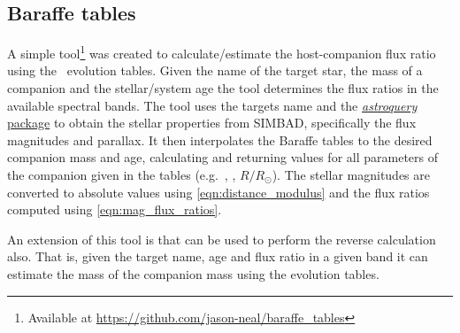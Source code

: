 \subsection{Baraffe tables}
\label{subsubsec:baraffe_tables_code}
A simple tool\footnote{Available at \href{https://github.com/jason-neal/baraffe_tables}{https://github.com/jason-neal/baraffe\_tables}} was created to calculate/estimate the host-companion flux ratio using the~\citet{baraffe_evolutionary_2003, baraffe_new_2015} evolution tables.
Given the name of the target star, the mass of a companion and the stellar/system age the tool determines the flux ratios in the available spectral bands.
The tool uses the targets name and the \href{https://zenodo.org/record/1160627}{\emph{astroquery} package} to obtain the stellar properties from {SIMBAD}, specifically the flux magnitudes and parallax.
It then interpolates the Baraffe tables to the desired companion mass and age, calculating and returning values for all parameters of the companion given in the tables (e.g.\ \Teff{}, \logg{}, \(R/R_{\odot}\)).
The stellar magnitudes are converted to absolute values using \cref{eqn:distance_modulus} and the flux ratios computed using \cref{eqn:mag_flux_ratios}.

An extension of this tool is that can be used to perform the reverse calculation also.
That is, given the target name, age and flux ratio in a given band it can estimate the mass of the companion mass using the evolution tables.
